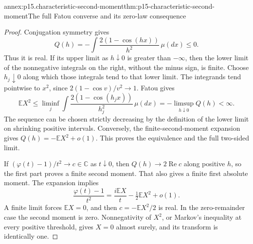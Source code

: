 \begin{annexitem}{annex:p15.characteristic-second-moment}{thm:p15-characteristic-second-moment}{The full Fatou converse and its zero-law consequence}
\begin{proof}
Conjugation symmetry gives
\[
 Q(h)=-\int\frac{2(1-\cos(hx))}{h^2}\,\mu(dx)\leq0.
\]
Thus it is real. If its upper limit as \(h\downarrow0\)
is greater than \(-\infty\), then the lower limit of
the nonnegative integrals on the right, without the
minus sign, is finite. Choose \(h_j\downarrow0\)
along which those integrals tend to that lower limit.
The integrands tend pointwise to \(x^2\), since
\(2(1-\cos v)/v^2\to1\).
Fatou gives
\[
 \mathbb EX^2\leq
 \liminf_j\int\frac{2(1-\cos(h_jx))}{h_j^2}\,\mu(dx)
 =-\limsup_{h\downarrow0}Q(h)<\infty.
\]
The sequence can be chosen strictly decreasing
by the definition of the lower limit on shrinking
positive intervals.
Conversely, the finite-second-moment expansion
gives \(Q(h)=-\mathbb EX^2+o(1)\).
This proves the equivalence and the full two-sided
limit.

If \((\varphi(t)-1)/t^2\to c\in\mathbb C\) as \(t\downarrow0\),
then \(Q(h)\to2\operatorname{Re}c\) along positive
\(h\), so the first part proves a finite second
moment. That also gives a finite first absolute
moment. The expansion implies
\[
 \frac{\varphi(t)-1}{t^2}
       =\frac{i\mathbb EX}{t}-\tfrac12\mathbb EX^2+o(1).
\]
A finite limit forces \(\mathbb EX=0\), and then
\(c=-\mathbb EX^2/2\) is real.
In the zero-remainder case the second moment
is zero. Nonnegativity of \(X^2\), or Markov's
inequality at every positive threshold, gives
\(X=0\) almost surely, and its transform is
identically one.
\end{proof}
\end{annexitem}


